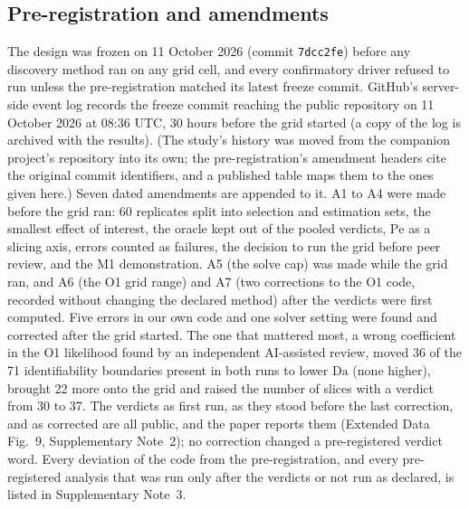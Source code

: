 \documentclass[11pt]{article}
\newcommand{\Da}{\mathrm{Da}}
\newcommand{\Pe}{\mathrm{Pe}}
\begin{document}
\subsection*{Pre-registration and amendments}
The design was frozen on 11 October 2026 (commit \texttt{7dcc2fe}) before any discovery method
ran on any grid cell, and every confirmatory driver refused to run unless the pre-registration
matched its latest freeze commit. GitHub's server-side event log records the freeze commit reaching
the public repository on 11 October 2026 at 08:36 UTC, 30 hours before the grid started (a copy of
the log is archived with the results). (The study's history was moved from the companion project's
repository into its own; the pre-registration's amendment headers cite the original commit
identifiers, and a published table maps them to the ones given here.) Seven dated amendments
are appended to it. A1 to A4 were made
before the grid ran: 60 replicates split into selection and estimation sets, the smallest
effect of interest, the oracle kept out of the pooled verdicts, $\Pe$ as a slicing axis,
errors counted as failures, the decision to run the grid before peer review, and the M1
demonstration. A5 (the solve cap) was made while the grid ran, and A6 (the O1 grid range)
and A7 (two corrections to the O1 code, recorded without changing the declared method)
after the verdicts were first computed. Five errors in our own code and one solver setting were
found and corrected after the grid started. The one that mattered most, a wrong coefficient in the
O1 likelihood found by an independent AI-assisted review, moved 36 of the 71 identifiability boundaries
present in both runs to lower $\Da$ (none higher), brought 22 more onto the grid and raised the
number of slices with a verdict from 30 to 37. The verdicts as first run, as they stood before the last
correction, and as corrected are all public, and the paper reports them (Extended Data Fig.~9,
Supplementary Note~2); no correction changed a pre-registered verdict word. Every deviation of
the code from the pre-registration, and every pre-registered analysis that was run only after the
verdicts or not run as declared, is listed in Supplementary Note~3.
\end{document}
